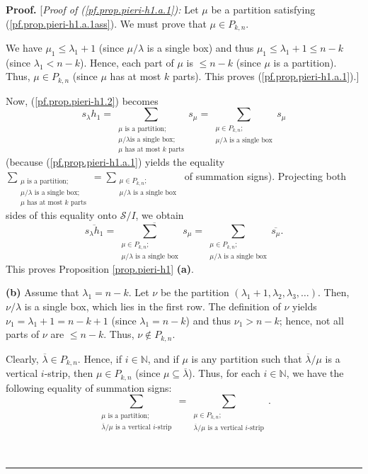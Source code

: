 \documentclass[numbers=enddot,12pt,final,onecolumn,notitlepage]{scrartcl}%
\theoremstyle{definition}
\newenvironment{proof}[1][Proof]{\noindent\textbf{#1.} }{\ \rule{0.5em}{0.5em}}
\let\sumnonlimits\sum
\renewcommand{\sum}{\sumnonlimits\limits}
\begin{document}
\begin{proof}
[\textit{Proof of (\ref{pf.prop.pieri-h1.a.1}):} Let $\mu$ be a partition
satisfying (\ref{pf.prop.pieri-h1.a.1ass}). We must prove that $\mu\in
P_{k,n}$.

We have $\mu_{1}\leq\lambda_{1}+1$ (since $\mu/\lambda$ is a single box) and
thus $\mu_{1}\leq\lambda_{1}+1\leq n-k$ (since $\lambda_{1}<n-k$). Hence, each
part of $\mu$ is $\leq n-k$ (since $\mu$ is a partition). Thus, $\mu\in
P_{k,n}$ (since $\mu$ has at most $k$ parts). This proves
(\ref{pf.prop.pieri-h1.a.1}).]

Now, (\ref{pf.prop.pieri-h1.2}) becomes%
\[
s_{\lambda}h_{1}=\sum_{\substack{\mu\text{ is a partition;}\\\mu/\lambda\text{
is a single box;}\\\mu\text{ has at most }k\text{ parts}}}s_{\mu}%
=\sum_{\substack{\mu\in P_{k,n};\\\mu/\lambda\text{ is a single box}}}s_{\mu}%
\]
(because (\ref{pf.prop.pieri-h1.a.1}) yields the equality $\sum_{\substack{\mu
\text{ is a partition;}\\\mu/\lambda\text{ is a single box;}\\\mu\text{ has at
most }k\text{ parts}}}=\sum_{\substack{\mu\in P_{k,n};\\\mu/\lambda\text{ is a
single box}}}$ of summation signs). Projecting both sides of this equality
onto $\mathcal{S}/I$, we obtain%
\[
\overline{s_{\lambda}h_{1}}=\overline{\sum_{\substack{\mu\in P_{k,n}%
;\\\mu/\lambda\text{ is a single box}}}s_{\mu}}=\sum_{\substack{\mu\in
P_{k,n};\\\mu/\lambda\text{ is a single box}}}\overline{s_{\mu}}.
\]
This proves Proposition \ref{prop.pieri-h1} \textbf{(a)}.

\textbf{(b)} Assume that $\lambda_{1}=n-k$. Let $\nu$ be the partition
$\left(  \lambda_{1}+1,\lambda_{2},\lambda_{3},\ldots\right)  $. Then,
$\nu/\lambda$ is a single box, which lies in the first row. The definition of
$\nu$ yields $\nu_{1}=\lambda_{1}+1=n-k+1$ (since $\lambda_{1}=n-k$) and thus
$\nu_{1}>n-k$; hence, not all parts of $\nu$ are $\leq n-k$. Thus, $\nu\notin
P_{k,n}$.

Clearly, $\overline{\lambda}\in P_{k,n}$. Hence, if $i\in\mathbb{N}$, and if
$\mu$ is any partition such that $\overline{\lambda}/\mu$ is a vertical
$i$-strip, then $\mu\in P_{k,n}$ (since $\mu\subseteq\overline{\lambda}$).
Thus, for each $i\in\mathbb{N}$, we have the following equality of summation
signs:%
\begin{equation}
\sum_{\substack{\mu\text{ is a partition;}\\\overline{\lambda}/\mu\text{ is a
vertical }i\text{-strip}}}=\sum_{\substack{\mu\in P_{k,n};\\\overline{\lambda
}/\mu\text{ is a vertical }i\text{-strip}}}. \label{pf.prop.pieri-h1.b.-1}%
\end{equation}



\end{proof}
\end{document}
